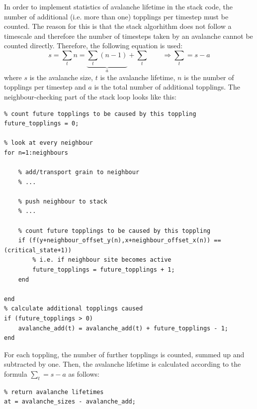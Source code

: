 In order to implement statistics of avalanche lifetime in the stack code, the number of additional (i.e. more than one) topplings per timestep must be counted. The reason for this is that the stack algorhithm does not follow a timescale and therefore the number of timesteps taken by an avalanche cannot be counted directly. Therefore, the following equation is used:
\[
s = \sum _t n = \underbrace{\sum_t (n - 1)}_{a} + \sum _t
\qquad \Rightarrow \sum _t = s - a
\]
where $s$ is the avalanche size, $t$ is the avalanche lifetime, $n$ is the number of topplings per timestep and $a$ is the total number of additional topplings. The neighbour-checking part of the stack loop looks like this:
\begin{lstlisting}
% count future topplings to be caused by this toppling
future_topplings = 0;

% look at every neighbour
for n=1:neighbours

	% add/transport grain to neighbour
	% ...

	% push neighbour to stack
	% ...

	% count future topplings to be caused by this toppling
	if (f(y+neighbour_offset_y(n),x+neighbour_offset_x(n)) == (critical_state+1))
		% i.e. if neighbour site becomes active
		future_topplings = future_topplings + 1;
	end

end
% calculate additional topplings caused
if (future_topplings > 0)
	avalanche_add(t) = avalanche_add(t) + future_topplings - 1;
end
\end{lstlisting}
For each toppling, the number of further topplings is counted, summed up and subtracted by one. Then, the avalanche lifetime is calculated according to the formula $\sum _t = s - a$ as follows:
\begin{lstlisting}
% return avalanche lifetimes
at = avalanche_sizes - avalanche_add;
\end{lstlisting}


